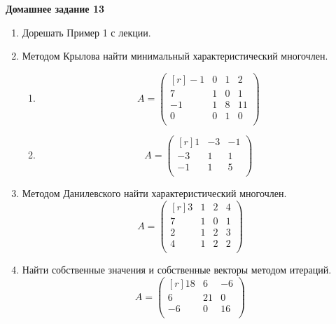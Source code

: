 \documentclass[12pt]{article}
\theoremstyle{definition}
\numberwithin{equation}{section}
\begin{document}
	\textbf{Домашнее задание 13}\begin{enumerate}
		\item Дорешать Пример 1 с лекции.
		\item Методом Крылова найти минимальный характеристический многочлен.
		\begin{enumerate}
			\item \[A = \begin{pmatrix}[r]
			-1 & 0 & 1 & 2\\
			7 & 1 & 0 & 1\\
			-1 & 1 & 8 & 11\\
			0 & 0 & 1 & 0\\
			\end{pmatrix}\]
			\item \[A = \begin{pmatrix}[r]
			1 & -3 & -1\\
			-3 & 1 & 1\\
			-1 & 1 & 5\\
			\end{pmatrix}\]
		\end{enumerate}
		\item Методом Данилевского найти характеристический многочлен.
		\[A = \begin{pmatrix}[r]
		3 & 1 & 2 & 4\\
		7 & 1 & 0 & 1\\
		2 & 1 & 2 & 3\\
		4 & 1 & 2 & 2\\
		\end{pmatrix}\]
		\item Найти собственные значения и собственные векторы методом итераций.
		\[A = \begin{pmatrix}[r]
		18 & 6 & -6\\
		6 & 21 & 0\\
		-6 & 0 & 16\\
		\end{pmatrix}\]
	\end{enumerate}
	~\\
\end{document}

